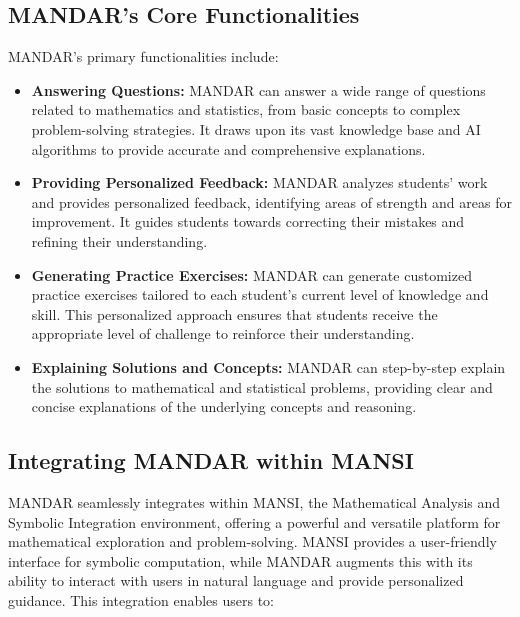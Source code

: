 \documentclass[20pt]{report}
\begin{document}
\subsection{MANDAR's Core Functionalities}

MANDAR's primary functionalities include:

\begin{itemize}

\item \textbf{Answering Questions:} MANDAR can answer a wide range of questions related to mathematics and statistics, from basic concepts to complex problem-solving strategies. It draws upon its vast knowledge base and AI algorithms to provide accurate and comprehensive explanations.

\item \textbf{Providing Personalized Feedback:} MANDAR analyzes students' work and provides personalized feedback, identifying areas of strength and areas for improvement. It guides students towards correcting their mistakes and refining their understanding.

\item \textbf{Generating Practice Exercises:} MANDAR can generate customized practice exercises tailored to each student's current level of knowledge and skill. This personalized approach ensures that students receive the appropriate level of challenge to reinforce their understanding.

\item \textbf{Explaining Solutions and Concepts:} MANDAR can step-by-step explain the solutions to mathematical and statistical problems, providing clear and concise explanations of the underlying concepts and reasoning.
\end{itemize}
\subsection{Integrating MANDAR within MANSI}

MANDAR seamlessly integrates within MANSI, the Mathematical Analysis and Symbolic Integration environment, offering a powerful and versatile platform for mathematical exploration and problem-solving. MANSI provides a user-friendly interface for symbolic computation, while MANDAR augments this with its ability to interact with users in natural language and provide personalized guidance. This integration enables users to:
\end{document}
